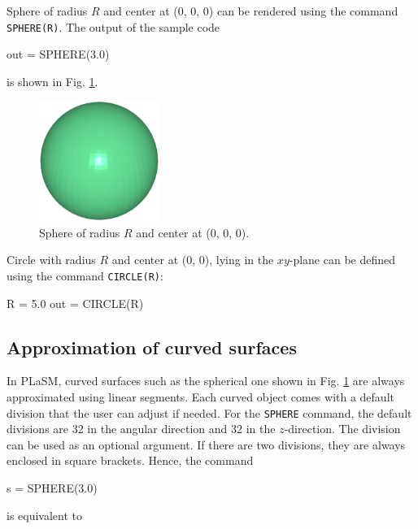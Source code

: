 Sphere of radius $R$ and center at (0, 0, 0) can be rendered using the command 
{\tt SPHERE(R)}. The output of the sample code

\begin{bluecode}
out = SPHERE(3.0)
\end{bluecode}
is shown in Fig. \ref{fig:sphere-1}.

\begin{figure}[!ht]
\begin{center}
\includegraphics[width=0.35\textwidth]{img/sphere-1.png}
\end{center}
\vspace{-4mm}
\caption{Sphere of radius $R$ and center at (0, 0, 0).}
\label{fig:sphere-1}
\vspace{-1cm}
\end{figure}
\newpage
\noindent
Circle with radius $R$ and center at (0, 0), lying in the $xy$-plane 
can be defined using the command {\tt CIRCLE(R)}:

\begin{bluecode}
R = 5.0
out = CIRCLE(R)
\end{bluecode}

\subsection{Approximation of curved surfaces} 

In PLaSM, curved surfaces such as the spherical one shown in Fig. \ref{fig:sphere-1}
are always approximated using linear segments. Each curved object comes
with a default division that the user can adjust if needed. For the 
{\tt SPHERE} command, the default divisions are 32 in the angular direction 
and 32 in the $z$-direction. The division can be used as an optional argument.
If there are two divisions, they are always enclosed in square brackets. Hence, 
the command

\begin{bluecode}
s = SPHERE(3.0)
\end{bluecode}
is equivalent to 

